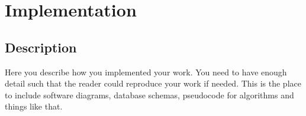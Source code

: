 \chapter{Implementation}
\label{ch:implementation}


\section{Description}
Here you describe how you implemented your work. You need to have enough detail such that the reader could reproduce your work if needed. This is the place to include software diagrams, database schemas, pseudocode for algorithms and things like that.


